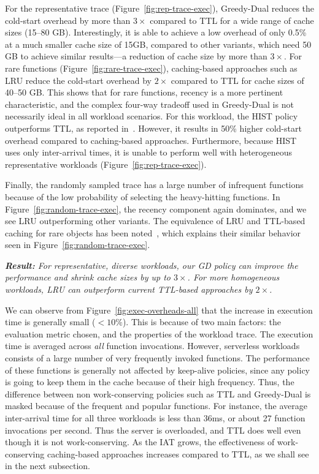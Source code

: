For the representative trace (Figure~\ref{fig:rep-trace-exec}), Greedy-Dual reduces the cold-start overhead by more than $3\times$ compared to TTL for a wide range of cache sizes (15--80 GB). 
Interestingly, it is able to achieve a low overhead of only 0.5\% at a much smaller cache size of 15GB, compared to other variants, which need 50 GB to achieve similar results---a reduction of cache size by more than $3\times$. 
%
For rare functions (Figure~\ref{fig:rare-trace-exec}), caching-based approaches such as LRU  reduce the cold-start overhead by $2\times$ compared to TTL for cache sizes of 40--50 GB. 
This shows that for rare functions, recency is a more pertinent characteristic, and the complex four-way tradeoff used in Greedy-Dual is not necessarily ideal in all workload scenarios. 
For this workload, the HIST policy outperforms TTL, as reported in~\cite{shahrad_serverless_2020}. 
However, it results in 50\% higher cold-start overhead compared to caching-based approaches.
Furthermore, because HIST uses only inter-arrival times, it is unable to perform well with heterogeneous representative workloads  (Figure~\ref{fig:rep-trace-exec}). 


Finally, the randomly sampled trace has a large number of infrequent functions because of the low probability of selecting the heavy-hitting functions.
In Figure~\ref{fig:random-trace-exec}, the recency component again dominates, and we see LRU outperforming other variants. 
The equivalence of LRU and TTL-based caching for rare objects has been noted~\cite{basu2017adaptive,jiang2018convergence}, which explains their similar behavior seen in Figure~\ref{fig:random-trace-exec}. 


\noindent \emph{\textbf{Result:} For representative, diverse workloads, our GD policy can improve the performance and shrink cache sizes by up to $3\times$. For more homogeneous workloads, LRU can outperform current TTL-based approaches by $2\times$.}

We can observe from Figure~\ref{fig:exec-overheads-all} that the increase in execution time is generally small ($<10\%$).
This is because of two main factors: the evaluation metric chosen, and the properties of the workload trace. 
The execution time is averaged across \emph{all} function invocations.
However, serverless workloads consists of a large number of very frequently invoked functions. 
The performance of these functions is generally not affected by keep-alive policies, since any policy is going to keep them in the cache because of their high frequency. 
Thus, the difference between non work-conserving policies such as TTL and Greedy-Dual is masked because of the frequent and popular functions. 
For instance, the average inter-arrival time for all three workloads is less than 36ms, or about 27 function invocations per second. 
Thus the server is overloaded, and TTL does well even though it is not work-conserving. 
As the IAT grows, the effectiveness of work-conserving caching-based approaches increases compared to TTL, as we shall see in the next subsection. 

